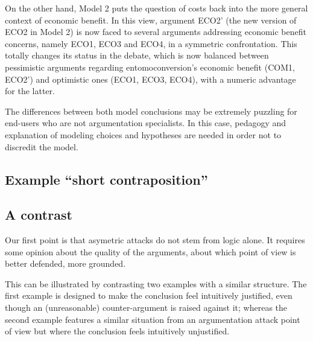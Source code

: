 \documentclass[version=3.21, pagesize, twoside=off, bibliography=totoc, DIV=calc, fontsize=12pt, a4paper, french, english]{scrartcl}
\begin{document}
On the other hand, Model 2 puts the question of costs back into the more general context of economic benefit. In this view, argument ECO2' (the new version of ECO2 in Model 2) is now faced to several arguments addressing economic benefit concerns, namely ECO1, ECO3 and ECO4, in a symmetric confrontation. This totally changes its status in the debate, which is now balanced between pessimistic arguments regarding entomoconversion's economic benefit (COM1, ECO2') and optimistic ones (ECO1, ECO3, ECO4), with a numeric advantage for the latter.

The differences between both model conclusions may be extremely puzzling for end-users who are not argumentation specialists. In this case, pedagogy and explanation of modeling choices and hypotheses are needed in order not to discredit the model.

\subsection{Example “short contraposition”}

\subsection{A contrast}
Our first point is that asymetric attacks do not stem from logic alone. It requires some opinion about the quality of the arguments, about which point of view is better defended, more grounded.

This can be illustrated by contrasting two examples with a similar structure. The first example is designed to make the conclusion feel intuitively justified, even though an (unreasonable) counter-argument is raised against it; whereas the second example features a similar situation from an argumentation attack point of view but where the conclusion feels intuitively unjustified.
\end{document}
